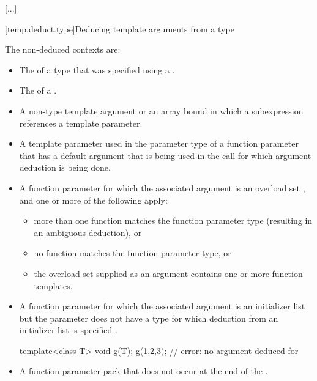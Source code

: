 \documentclass{wg21}
\begin{document}
\textcolor{noteclr}{[...]}

[temp.deduct.type]{Deducing template arguments from a type}



\pnum
The non-deduced contexts are:

%
\begin{itemize}
    \item
    The
    of a type that was specified using a
    .
    \item
    The  of a .
    \item
    A non-type template argument or an array bound in which a subexpression
    references a template parameter.
    \item
    A template parameter used in the parameter type of a function parameter that
    has a default argument that is being used in the call for which argument
    deduction is being done.
    \item
    A function parameter for which the associated argument is an
    overload set , and one or more of the following apply:
    \begin{itemize}
        \item
        more than one function matches the function parameter type (resulting in
        an ambiguous deduction), or
        \item
        no function matches the function parameter type, or
        \item
        the overload set supplied as an argument contains one or more function templates.
    \end{itemize}
    \item A function parameter for which the associated argument is an initializer
    list  but the parameter does not have
    a type for which deduction from an initializer list is specified .
    \begin{example}
        \begin{codeblock}
            template<class T> void g(T);
            g({1,2,3});                 // error: no argument deduced for 
        \end{codeblock}
    \end{example}
    \item A function parameter pack that does not occur at the end of the
    .
\end{itemize}
\end{document}
